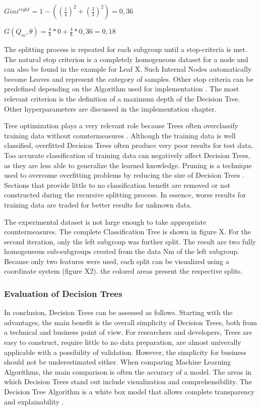 \(Gini^{right} = 1 - ((\frac{1}{4})^2 + (\frac{3}{4})^2) = 0,36 \)

\(G(Q_{m},\theta) = \frac{4}{8} * 0 + \frac{4}{8} * 0,36 = 0,18 \)

The splitting process is repeated for each subgroup until a stop-criteria is met. The natural 
stop criterion is a completely homogeneous dataset for a node and can also be found in the 
example for Leaf X. Such Internal Nodes automatically become Leaves and represent the category 
of samples. Other stop criteria can be predefined depending on the Algorithm used for 
implementation \cite[p.7]{lewis2000introduction}. The most relevant criterion is the definition of a maximum depth of the Decision 
Tree. Other hyperparameters are discussed in the implementation chapter. 

Tree optimization plays a very relevant role because Trees often overclassify training data 
without countermeasures \cite[p.7]{lewis2000introduction}. Although the training data is well classified, overfitted Decision 
Trees often produce very poor results for test data. Too accurate classification of training 
data can negatively affect Decision Trees, as they are less able to generalize the learned 
knowledge. Pruning is a technique used to overcome overfitting problems by reducing the size of 
Decision Trees \cite[p.331]{James2021}. Sections that provide little to no classification benefit are removed or not 
constructed during the recursive splitting process. In essence, worse results for training data 
are traded for better results for unknown data.

The experimental dataset is not large enough to take appropriate countermeasures. The complete 
Classification Tree is shown in figure X. For the second iteration, only the left subgroup was 
further split. The result are two fully homogeneous sub-subgroups created from the data Nm of the 
left subgroup. Because only two features were used, each split can be visualized using a 
coordinate system (figure X2). the colored areas present the respective splits.

\subsubsection{Evaluation of Decision Trees}

In conclusion, Decision Trees can be assessed as follows. Starting with the advantages,
the main benefit is the overall simplicity of Decision Trees, both from a technical and 
business point of view. For researchers and developers, Trees are easy to construct, require little
to no data preparation, are almost univerally applicable with a possibility of validation. 
However, the simplicity for business should not be underestimated either. When comparing Machine
Learning Algorithms, the main comparison is often the accuracy of a model. The areas in which 
Decision Trees stand out include visualization and comprehensibility. The Decision Tree Algorithm 
is a white box model that allows complete transparency and explainability \cite[p.339]{James2021} \cite[10.10.]{sklearn Decision Trees}. 

